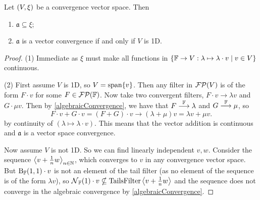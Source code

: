 \begin{lemma} \label{algebraicConvergenceStrength}
Let $\left( V,\xi \right)$ be a convergence vector space. Then
\begin{enumerate}
\item $\mathfrak{a} \subseteq \xi$;
\item $\mathfrak{a}$ is a vector convergence \textup{if and only if} $V$ is 1D.
\end{enumerate}
\end{lemma}
\begin{proof}
(1) Immediate as $\xi$ must make all functions in $\left\{ \mathbb{F} \to V: \lambda\mapsto \lambda \cdot v \;\middle|\; v\in V \right\}$ continuous.

(2) First assume $V$ is 1D, so $V = \operatorname{span}\{v\}$. Then any filter in $\operatorname{\mathcal{FP}}(V)$ is of the form $F\cdot v$ for some $F\in \operatorname{\mathcal{FP}}(\mathbb{F})$. Now take two convergent filters, $F\cdot v\to \lambda v$ and $G\cdot \mu v$. Then by \ref{algebraicConvergence}, we have that $F \overset{\mathbb{F}}{\longrightarrow} \lambda$ and $G \overset{\mathbb{F}}{\longrightarrow} \mu$, so
\[ F\cdot v + G\cdot v = (F+G)\cdot v \to (\lambda +\mu)v = \lambda v + \mu v. \]
by continuity of $(\lambda\mapsto \lambda \cdot v)$. This means that the vector addition is continuous and $\mathfrak{a}$ is a vector space convergence.

Now assume $V$ is not 1D. So we can find linearly independent $v,w$. Consider the sequence $\left\langle v + \frac{1}{n}w \right\rangle_{n\in\mathbb{N}}$, which converges to $v$ in any convergence vector space. But $\operatorname{B}_{\mathbb{F}}(1,1)\cdot v$ is not an element of the tail filter (as no element of the sequence is of the form $\lambda v$), so $\operatorname{\mathcal{N}}_{\mathbb{F}}(1)\cdot v \nsubseteq \operatorname{TailsFilter}\left\langle v + \frac{1}{n}w \right\rangle$ and the sequence does not converge in the algebraic convergence by \ref{algebraicConvergence}.
\end{proof}

